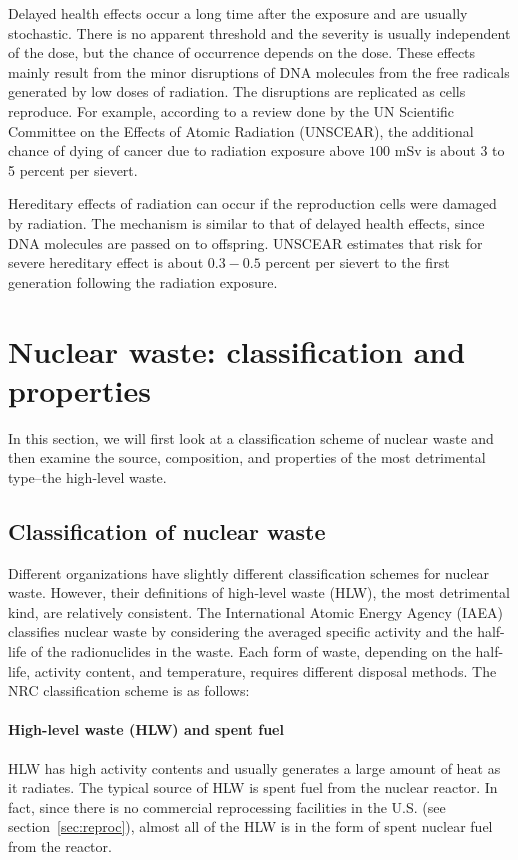 \documentclass[nofootinbib,preprint,aps]{revtex4-1}
\begin{document}
        Delayed health effects occur a long time after the exposure and are usually stochastic. There is
        no apparent threshold and the severity is usually independent of the dose, but
        the chance of occurrence depends on the dose.\cite{u16}
        These effects mainly result from the minor disruptions of DNA molecules from the free radicals generated
        by low doses of radiation. The disruptions are replicated
        as cells reproduce.
        For example, according to a review done by the UN Scientific Committee on the Effects of Atomic Radiation
        (UNSCEAR), the additional chance of dying of cancer due to radiation exposure above $100$ mSv is
        about 3 to 5 percent per sievert.\cite{unscear16}

        Hereditary effects of radiation can occur if the reproduction cells were damaged by radiation.
        The mechanism is similar to that of delayed health effects, since DNA molecules are passed on
        to offspring.
        UNSCEAR estimates that risk for severe hereditary effect is about $0.3-0.5$ percent per sievert to
        the first generation following the radiation exposure.\cite{u16, unscear16}
\section{Nuclear waste: classification and properties}
\label{sec:waste}
    In this section, we will first look at a classification scheme of nuclear waste and then
    examine the source, composition, and properties of the most detrimental type--the high-level waste.
    \subsection{Classification of nuclear waste}
    \label{sec:waste:classification}
    Different organizations have slightly different classification schemes for nuclear waste.
    However, their definitions of high-level waste (HLW), the most detrimental kind, are relatively consistent.
    The International Atomic Energy Agency (IAEA) classifies nuclear waste by considering the averaged specific activity
    and the half-life of the radionuclides in the waste.\cite{iaea09}
    Each form of waste, depending on the half-life, activity content, and temperature, requires different
    disposal methods. The NRC classification scheme is as follows:\cite{nrc09}

    \paragraph{High-level waste (HLW) and spent fuel}
    HLW has high activity contents and usually generates a large amount of
    heat as it radiates. The typical source of HLW is spent fuel from the nuclear reactor.
    In fact, since there is no commercial reprocessing facilities in the U.S. (see section~\ref{sec:reproc}),
    almost all of the HLW is in the form of spent nuclear fuel from the reactor.
\end{document}
